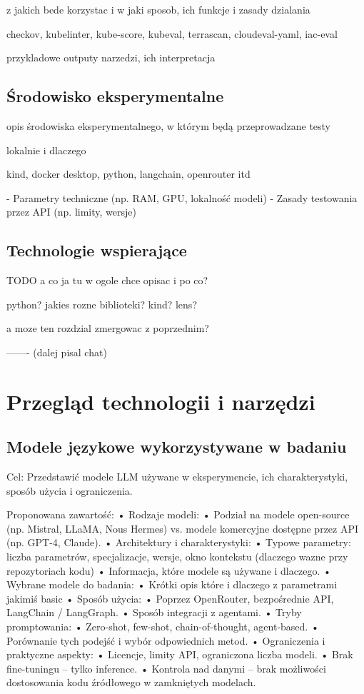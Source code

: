 z jakich bede korzystac i w jaki sposob, ich funkcje i zasady dzialania

checkov, kubelinter, kube-score, kubeval, terrascan, cloudeval-yaml, iac-eval

przykladowe outputy narzedzi, ich interpretacja

\subsection{Środowisko eksperymentalne}

opis środowiska eksperymentalnego, w którym będą przeprowadzane testy

lokalnie i dlaczego

kind, docker desktop, python, langchain, openrouter itd

- Parametry techniczne (np. RAM, GPU, lokalność modeli)
- Zasady testowania przez API (np. limity, wersje)

\subsection{Technologie wspierające}

TODO a co ja tu w ogole chce opisac i po co?

python? jakies rozne biblioteki? kind? lens? 

a moze ten rozdzial zmergowac z poprzednim?


------- (dalej pisal chat)

\section{Przegląd technologii i narzędzi}

\subsection{Modele językowe wykorzystywane w badaniu}

Cel: Przedstawić modele LLM używane w eksperymencie, ich charakterystyki, sposób użycia i ograniczenia.

Proponowana zawartość:
	•	Rodzaje modeli:
	•	    Podział na modele open-source (np. Mistral, LLaMA, Nous Hermes) vs. modele komercyjne dostępne przez API (np. GPT-4, Claude).
	•	Architektury i charakterystyki:
	•	    Typowe parametry: liczba parametrów, specjalizacje, wersje, okno kontekstu (dlaczego wazne przy repozytoriach kodu)
	•	    Informacja, które modele są używane i dlaczego.
    •   Wybrane modele do badania:
    •       Krótki opis które i dlaczego z parametrami jakimiś basic
	•	Sposób użycia:
	•	    Poprzez OpenRouter, bezpośrednie API, LangChain / LangGraph.
	•	    Sposób integracji z agentami.
	•	Tryby promptowania:
	•	    Zero-shot, few-shot, chain-of-thought, agent-based.
	•	    Porównanie tych podejść i wybór odpowiednich metod.
	•	Ograniczenia i praktyczne aspekty:
	•	    Licencje, limity API, ograniczona liczba modeli.
	•	    Brak fine-tuningu – tylko inference.
	•	    Kontrola nad danymi – brak możliwości dostosowania kodu źródłowego w zamkniętych modelach.

